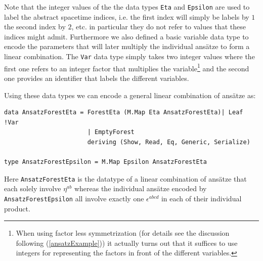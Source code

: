\documentclass[a4paper,12pt, DIV=14, BCOR=5mm, twoside, headsepline]{scrbook}
\begin{document}
Note that the integer values of the the data types \texttt{Eta} and \texttt{Epsilon} are used to label the abstract spacetime indices, i.e. the first index will simply be labels by $1$ the second index by $2$, etc. in particular they do not refer to values that these indices might admit.
Furthermore we also defined a basic variable data type to encode the parameters that will later multiply the individual ansätze to form a linear combination. The \texttt{Var}
data type simply takes two integer values where the first one refers to an integer factor that multiplies the variable\footnote{When using factor less symmetrization (for details see the discussion following (\ref{ansatzExample})) it actually turns out that it suffices to use integers for representing the factors in front of the different variables.} and the second one provides an identifier that labels the different variables. 

Using these data types we can encode a general linear combination of ansätze as:

\begin{samepage} 
\begin{verbatim}
data AnsatzForestEta = ForestEta (M.Map Eta AnsatzForestEta)| Leaf !Var
                       | EmptyForest 
                       deriving (Show, Read, Eq, Generic, Serialize)

type AnsatzForestEpsilon = M.Map Epsilon AnsatzForestEta
\end{verbatim} 
\end{samepage}

Here \texttt{AnsatzForestEta} is the datatype of a linear combination of ansätze that each solely involve $\eta^{ab}$ whereas the individual ansätze encoded by \texttt{AnsatzForestEpsilon} all involve exactly one $\epsilon^{abcd}$ in each of their individual product.
\end{document}
